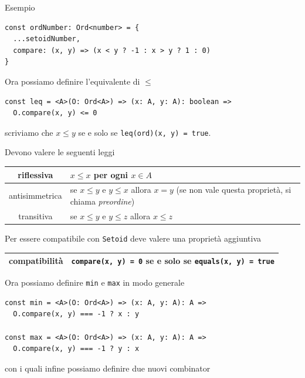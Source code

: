 \documentclass[12pt]{article}
\begin{document}
Esempio

\begin{verbatim}
const ordNumber: Ord<number> = {
  ...setoidNumber,
  compare: (x, y) => (x < y ? -1 : x > y ? 1 : 0)
}
\end{verbatim}


Ora possiamo definire l'equivalente di $\leq$

\begin{verbatim}
const leq = <A>(O: Ord<A>) => (x: A, y: A): boolean =>
  O.compare(x, y) <= 0
\end{verbatim}

scriviamo che $x \leq y$ se e solo se \texttt{leq(ord)(x, y) = true}.

Devono valere le seguenti leggi

\begin{center}
\bgroup
\def\arraystretch{1.5}
\begin{tabular}{ |c|p{10cm}| }
\hline
riflessiva & $x \leq x$ per ogni $x \in A$ \\
\hline
antisimmetrica & se $x \leq y$ e $y \leq x$ allora $x = y$ (se non vale questa proprietà, si chiama \emph{preordine}) \\
\hline
transitiva & se $x \leq y$ e $y \leq z$ allora $x \leq z$ \\
\hline
\end{tabular}
\egroup
\end{center}

Per essere compatibile con \texttt{Setoid} deve valere una proprietà aggiuntiva

\begin{center}
\bgroup
\def\arraystretch{1.5}
\begin{tabular}{ |c|p{10cm}| }
\hline
compatibilità & \texttt{compare(x, y) = 0} se e solo se \texttt{equals(x, y) = true} \\
\hline
\end{tabular}
\egroup
\end{center}

Ora possiamo definire \texttt{min} e \texttt{max} in modo generale

\begin{verbatim}
const min = <A>(O: Ord<A>) => (x: A, y: A): A =>
  O.compare(x, y) === -1 ? x : y

const max = <A>(O: Ord<A>) => (x: A, y: A): A =>
  O.compare(x, y) === -1 ? y : x
\end{verbatim}

con i quali infine possiamo definire due nuovi combinator
\end{document}
